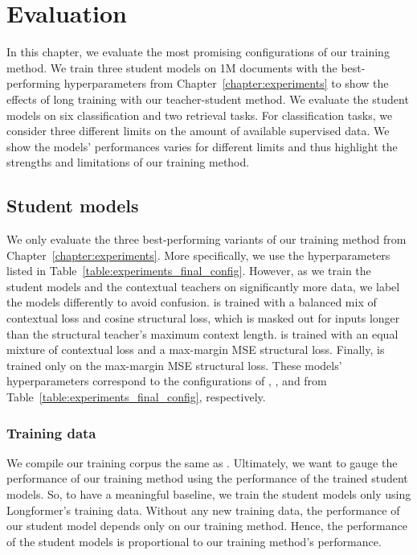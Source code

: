 \chapter{Evaluation}\label{chapter:evaluation}

In this chapter, we evaluate the most promising configurations of our training
method. We train three student models on 1M documents with the best-performing
hyperparameters from Chapter~\ref{chapter:experiments} to show the effects of
long training with our teacher-student method. We evaluate the student models
on six classification and two retrieval tasks. For classification tasks, we
consider three different limits on the amount of available supervised data. We
show the models' performances varies for different limits and thus highlight
the strengths and limitations of our training method.

\section{Student models}

We only evaluate the three best-performing variants of our training method from
Chapter~\ref{chapter:experiments}. More specifically, we use the
hyperparameters listed in Table~\ref{table:experiments_final_config}. However,
as we train the student models and the contextual teachers on significantly
more data, we label the models differently to avoid confusion. {\CosineStudent}
is trained with a balanced mix of contextual loss and cosine structural loss,
which is masked out for inputs longer than the structural teacher's maximum
context length. {\MSEStudent} is trained with an equal mixture of contextual
loss and a max-margin MSE structural loss. Finally, {\OnlyMSEStudent} is
trained only on the max-margin MSE structural loss. These models'
hyperparameters correspond to the configurations of
, , and
 from Table~\ref{table:experiments_final_config},
respectively.

\subsection{Training data}

We compile our training corpus the same as . Ultimately, we
want to gauge the performance of our training method using the performance of
the trained student models. So, to have a meaningful baseline, we train the
student models only using Longformer's training data. Without any new training
data, the performance of our student model depends only on our training
method. Hence, the performance of the student models is proportional to our
training method's performance.

